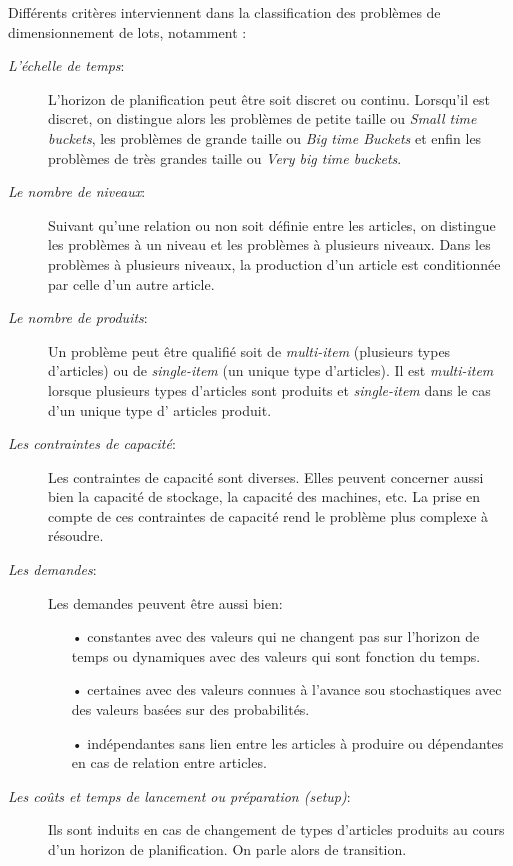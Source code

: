 Différents critères interviennent dans la classification des problèmes de dimensionnement de lots, notamment : 
\begin{description}
	\item[\textsl{L'échelle de temps}:] L'horizon de planification peut être soit discret ou continu. Lorsqu'il est discret, on distingue alors les problèmes de petite taille ou \emph{Small time buckets}, les problèmes de grande taille ou \emph{Big time Buckets} et enfin les problèmes de très grandes taille ou \emph{Very big time buckets}.

	\item[\textsl{Le nombre de niveaux}:] Suivant qu'une relation ou non soit définie entre les articles, on distingue les problèmes à un niveau et les problèmes à plusieurs niveaux. Dans les problèmes à plusieurs niveaux, la production d'un article est conditionnée par celle d'un autre article. 

	\item[\textsl{Le nombre de produits}:] Un problème peut être qualifié soit de \emph{multi-item} (plusieurs types d'articles) ou de \emph{single-item} (un unique type d'articles). Il est \emph{multi-item} lorsque plusieurs types d'articles sont produits et \emph{single-item} dans le cas d'un unique type d' articles produit. 

	\item[\textsl{Les contraintes de capacité}:] Les contraintes de capacité sont diverses. Elles peuvent concerner aussi bien la capacité de stockage, la capacité des machines, etc. La prise en compte de ces contraintes de capacité rend le problème plus complexe à résoudre.

	\item[\textsl{Les demandes}:] Les demandes peuvent être aussi bien:
	\begin{itemize}
		\item[•] constantes avec des valeurs qui ne changent pas sur l'horizon de temps ou dynamiques avec  des valeurs qui sont fonction du temps.
		\item[•] certaines avec des valeurs connues à l'avance sou stochastiques avec des valeurs basées sur des probabilités.
		\item[•] indépendantes sans lien entre les articles à produire ou dépendantes en cas de relation entre articles.
	\end{itemize}

	\item[\textsl{Les coûts et temps de lancement ou préparation (setup)}:] Ils sont induits en cas de changement de types d'articles produits au cours d'un horizon de planification. On parle alors de transition.
	
\end{description}

